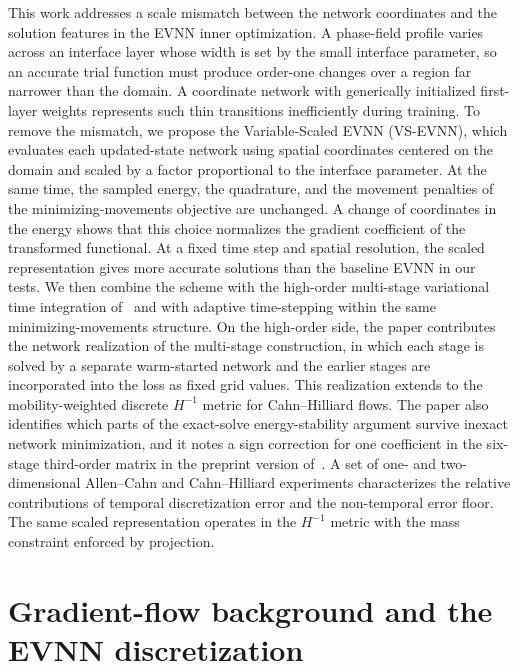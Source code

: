 \documentclass[11pt,letterpaper]{article}
\theoremstyle{plain}
\theoremstyle{definition}
\begin{document}
This work addresses a scale mismatch between the network coordinates and the solution features in the EVNN inner optimization. A phase-field profile varies across an interface layer whose width is set by the small interface parameter, so an accurate trial function must produce order-one changes over a region far narrower than the domain. A coordinate network with generically initialized first-layer weights represents such thin transitions inefficiently during training. To remove the mismatch, we propose the Variable-Scaled EVNN (VS-EVNN), which evaluates each updated-state network using spatial coordinates centered on the domain and scaled by a factor proportional to the interface parameter. At the same time, the sampled energy, the quadrature, and the movement penalties of the minimizing-movements objective are unchanged. A change of coordinates in the energy shows that this choice normalizes the gradient coefficient of the transformed functional. At a fixed time step and spatial resolution, the scaled representation gives more accurate solutions than the baseline EVNN in our tests. We then combine the scheme with the high-order multi-stage variational time integration of~\cite{Zaitzeff2020} and with adaptive time-stepping within the same minimizing-movements structure. On the high-order side, the paper contributes the network realization of the multi-stage construction, in which each stage is solved by a separate warm-started network and the earlier stages are incorporated into the loss as fixed grid values. This realization extends to the mobility-weighted discrete $H^{-1}$ metric for Cahn--Hilliard flows. The paper also identifies which parts of the exact-solve energy-stability argument survive inexact network minimization, and it notes a sign correction for one coefficient in the six-stage third-order matrix in the preprint version of~\cite{Zaitzeff2020}. A set of one- and two-dimensional Allen--Cahn and Cahn--Hilliard experiments characterizes the relative contributions of temporal discretization error and the non-temporal error floor. The same scaled representation operates in the $H^{-1}$ metric with the mass constraint enforced by projection.


\section{Gradient-flow background and the EVNN discretization}
\end{document}
